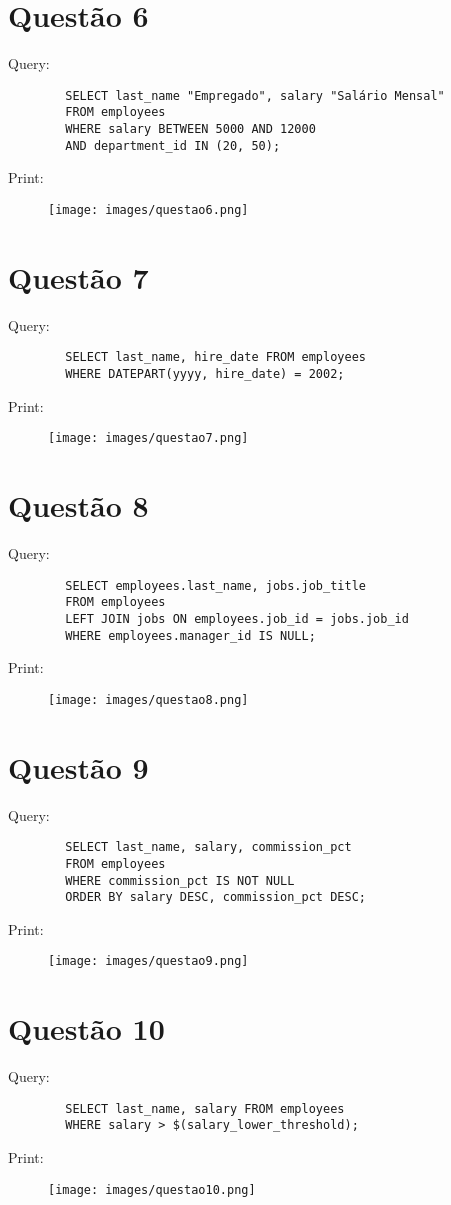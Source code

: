 \documentclass{article}[twocolumn]
\begin{document}
	\section{Quest\~ao 6}
	Query:
	\begin{verbatim}
		SELECT last_name "Empregado", salary "Salário Mensal"
		FROM employees
		WHERE salary BETWEEN 5000 AND 12000
		AND department_id IN (20, 50);
	\end{verbatim}
	Print:
	\begin{figure}[H]
		\centering
		\texttt{[image: images/questao6.png]}
	\end{figure}
	\newpage
	\section{Quest\~ao 7}
	Query:
	\begin{verbatim}
		SELECT last_name, hire_date FROM employees
		WHERE DATEPART(yyyy, hire_date) = 2002;
	\end{verbatim}
	Print:
	\begin{figure}[H]
		\centering
		\texttt{[image: images/questao7.png]}
	\end{figure}
	\newpage
	\section{Quest\~ao 8}
	Query:
	\begin{verbatim}
		SELECT employees.last_name, jobs.job_title
		FROM employees
		LEFT JOIN jobs ON employees.job_id = jobs.job_id
		WHERE employees.manager_id IS NULL;
	\end{verbatim}
	Print:
	\begin{figure}[H]
		\centering
		\texttt{[image: images/questao8.png]}
	\end{figure}
	\newpage
	\section{Quest\~ao 9}
	Query:
	\begin{verbatim}
		SELECT last_name, salary, commission_pct
		FROM employees
		WHERE commission_pct IS NOT NULL
		ORDER BY salary DESC, commission_pct DESC;
	\end{verbatim}
	Print:
	\begin{figure}[H]
		\centering
		\texttt{[image: images/questao9.png]}
	\end{figure}
	\newpage
	\section{Quest\~ao 10}
	Query:
	\begin{verbatim}
		SELECT last_name, salary FROM employees
		WHERE salary > $(salary_lower_threshold);
	\end{verbatim}
	Print:
	\begin{figure}[H]
		\centering
		\texttt{[image: images/questao10.png]}
	\end{figure}
	\newpage
\end{document}

